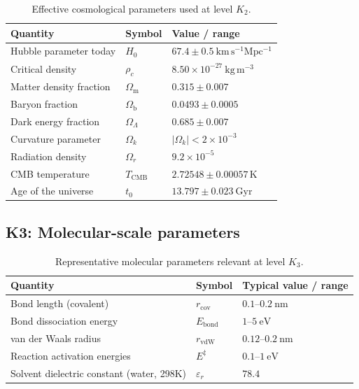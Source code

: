\begin{table}[h]
  \centering
  \caption{Effective cosmological parameters used at level \(K_2\).}
  \label{tab:k2-cosmological-parameters}
  \begin{tabular}{lll}
    \hline
    Quantity & Symbol & Value / range \\
    \hline
    Hubble parameter today & \(H_0\) 
        & \(67.4 \pm 0.5 ~ \mathrm{km\,s^{-1}Mpc^{-1}}\) \\
    Critical density       & \(\rho_c\)
        & \(8.50 \times 10^{-27} ~ \mathrm{kg\,m^{-3}}\) \\
    Matter density fraction & \(\Omega_\mathrm{m}\)
        & \(0.315 \pm 0.007\) \\
    Baryon fraction         & \(\Omega_\mathrm{b}\)
        & \(0.0493 \pm 0.0005\) \\
    Dark energy fraction    & \(\Omega_\Lambda\)
        & \(0.685 \pm 0.007\) \\
    Curvature parameter     & \(\Omega_k\)
        & \(|\Omega_k| < 2 \times 10^{-3}\) \\
    Radiation density       & \(\Omega_r\)
        & \(9.2 \times 10^{-5}\) \\
    CMB temperature         & \(T_\mathrm{CMB}\)
        & \(2.72548 \pm 0.00057 \,\mathrm{K}\) \\
    Age of the universe     & \(t_0\)
        & \(13.797 \pm 0.023 ~ \mathrm{Gyr}\) \\
    \hline
  \end{tabular}
\end{table}


\subsection*{K3: Molecular-scale parameters}

\begin{table}[h]
  \centering
  \caption{Representative molecular parameters relevant at level \(K_3\).}
  \label{tab:k3-molecular-parameters}
  \begin{tabular}{lll}
    \hline
    Quantity & Symbol & Typical value / range \\
    \hline
    Bond length (covalent) & \(r_\mathrm{cov}\)
        & \(0.1\text{–}0.2~\mathrm{nm}\) \\
    Bond dissociation energy & \(E_\mathrm{bond}\)
        & \(1\text{–}5~\mathrm{eV}\) \\
    van der Waals radius & \(r_\mathrm{vdW}\)
        & \(0.12\text{–}0.2~\mathrm{nm}\) \\
    Reaction activation energies & \(E^\ddagger\)
        & \(0.1\text{–}1~\mathrm{eV}\) \\
    Solvent dielectric constant (water, 298K)
        & \(\varepsilon_r\)
        & \(78.4\) \\
    \hline
  \end{tabular}
\end{table}

